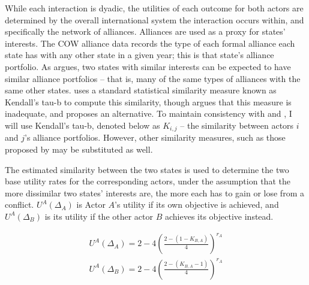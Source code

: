 While each interaction is dyadic, the utilities of each outcome for both actors are determined by the overall international system the interaction occurs within, and specifically the network of alliances. Alliances are used as a proxy for states' interests. The COW alliance data \citep{singer_1969} records the type of each formal alliance each state has with any other state in a given year; this is that state's alliance portfolio. As \citet{bdm_1975} argues, two states with similar interests can be expected to have similar alliance portfolios -- that is, many of the same types of alliances with the same other states. \citet{bdm_1992} uses a standard statistical similarity measure known as Kendall's tau-b to compute this similarity, though \citet{signorino_1999b} argues that this measure is inadequate, and proposes an alternative. To maintain consistency with \citet{bdm_1992} and \citet{bennett_2000}, I will use Kendall's tau-b, denoted below as $K_{i,j}$ -- the similarity between actors $i$ and $j$'s alliance portfolios. However, other similarity measures, such as those proposed by \citet{signorino_1999b} may be substituted as well.

The estimated similarity between the two states is used to determine the two base utility rates for the corresponding actors, under the assumption that the more dissimilar two states' interests are, the more each has to gain or lose from a conflict. $U^A(\Delta_A)$ is Actor $A$'s utility if its own objective is achieved, and $U^A(\Delta_B)$ is its utility if the other actor $B$ achieves its objective instead.

\begin{align} 	
	U^A(\Delta_A) = 2 - 4 \left(\frac{2-(1-K_{B,A})}{4}\right)^{r_A} \label{eq:u_a1}\\ 
	U^A(\Delta_B) = 2 - 4 \left(\frac{2-(K_{B,A}-1)}{4}\right)^{r_A} \label{eq:u_a2}
\end{align}


